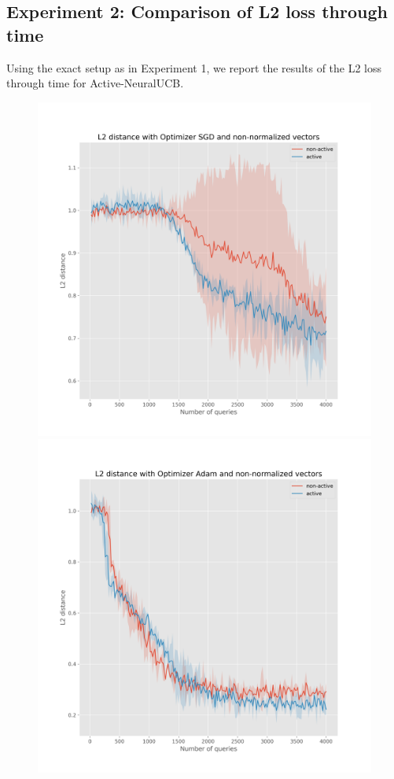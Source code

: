 \documentclass{article}
\begin{document}
\subsection{Experiment 2: Comparison of L2 loss through time}
Using the exact setup as in Experiment 1, we report the results of the L2 loss through time for Active-NeuralUCB.
\begin{figure}[!h]
  \centering
  \begin{minipage}{.45\textwidth}
    \centering
    \includegraphics[width=\linewidth]{active-vs-base-moons-l2-loss-SGD-non-normalized-ci}
  \end{minipage}%
  \begin{minipage}{.45\textwidth}
    \centering
    \includegraphics[width=\linewidth]{active-vs-base-moons-l2-loss-Adam-non-normalized-ci}

\end{minipage}
\end{figure}
\end{document}
